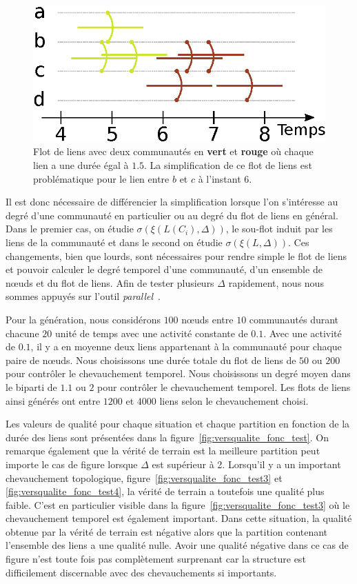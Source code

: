 \begin{figure}
\centering
	\includegraphics[width=0.65\linewidth]{img/Qualite/inter_flot.eps}
\caption{Flot de liens avec deux communautés en \textcolor{olivegreen}{\textbf{vert}} et  \textcolor{briquered}{\textbf{rouge}} où chaque lien a une durée égal à $1.5$.
La simplification de ce flot de liens est problématique pour le lien entre $b$ et $c$ à l'instant $6$.}
\label{fig:qualite_simplification}
\end{figure}

Il est donc nécessaire de différencier la simplification lorsque l'on s'intéresse au degré d'une communauté en particulier ou au degré du flot de liens en général.
Dans le premier cas, on étudie $\sigma(\xi(L(C_i),\Delta))$, le sou-flot induit par les liens de la communauté et dans le second on étudie $\sigma(\xi(L,\Delta))$.
Ces changements, bien que lourds, sont nécessaires pour rendre simple le flot de liens et pouvoir calculer le degré temporel d'une communauté, d'un ensemble de n\oe uds et du flot de liens.
Afin de tester plusieurs $\Delta$ rapidement, nous nous sommes appuyés sur l'outil \emph{parallel}~\cite{Tange2011a}.


\bigskip
Pour la génération, nous considérons $100$ n\oe uds entre $10$ communautés durant chacune $20$ unité de temps avec une activité constante de $0.1$.
Avec une activité de $0.1$, il y a en moyenne deux liens appartenant à la communauté pour chaque paire de n\oe uds.
Nous choisissons une durée totale du flot de liens de $50$ ou $200$ pour contrôler le chevauchement temporel.
Nous choisissons un degré moyen dans le biparti de $1.1$ ou $2$ pour contrôler le chevauchement temporel.
Les flots de liens ainsi générés ont entre $1 200$ et $4 000$ liens selon le chevauchement choisi.

Les valeurs de qualité pour chaque situation et chaque partition en fonction de la durée des liens sont présentées dans la figure~\ref{fig:versqualite_fonc_test}.
On remarque également que la vérité de terrain est la meilleure partition peut importe le cas de figure lorsque $\Delta$ est supérieur à 2.
Lorsqu'il y a un important chevauchement topologique, figure~\ref{fig:versqualite_fonc_test3} et \ref{fig:versqualite_fonc_test4}, la vérité de terrain a toutefois une qualité plus faible.
C'est en particulier visible dans la figure~\ref{fig:versqualite_fonc_test3} où le chevauchement temporel est également important.
Dans cette situation, la qualité obtenue par la vérité de terrain est négative alors que la partition contenant l'ensemble des liens a une qualité nulle.
Avoir une qualité négative dans ce cas de figure n'est toute fois pas complètement surprenant car la structure est difficilement discernable avec des chevauchements si importants.

